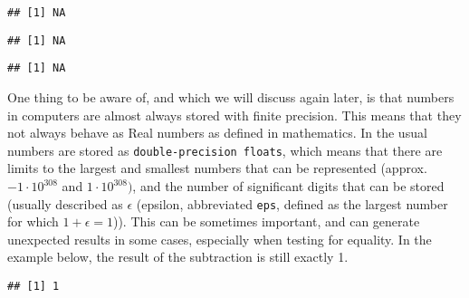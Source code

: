 \documentclass[paper=a4,headsepline,BCOR=12mm,twoside,open=right,%
titlepage,headings=small,fontsize=10pt,index=totoc,bibliography=totoc,%
captions=tableheading,captions=nooneline]{scrbook}\usepackage{knitr}
\begin{document}
\begin{knitrout}\footnotesize
{}\color{fgcolor}\begin{kframe}
\begin{alltt}
 \hlkwb{<-} 
\end{alltt}
\begin{verbatim}
## [1] NA
\end{verbatim}
\begin{alltt}
 \hlopt{+} 
\end{alltt}
\begin{verbatim}
## [1] NA
\end{verbatim}
\begin{alltt}
 \hlopt{+} 
\end{alltt}
\begin{verbatim}
## [1] NA
\end{verbatim}
\end{kframe}
\end{knitrout}

One thing to be aware of, and which we will discuss again later, is that numbers in computers are almost always stored with finite precision. This means that they not always behave as Real numbers as defined in mathematics. In \R the usual numbers are stored as \texttt{double-precision floats}, which means that there are limits to the largest and smallest numbers that can be represented (approx. $-1 \cdot 10^{308}$ and $1 \cdot 10^{308})$, and the number of significant digits that can be stored (usually described as $\epsilon$ (epsilon, abbreviated \texttt{eps}, defined as the largest number for which $ 1 + \epsilon = 1$)). This can be sometimes important, and can generate unexpected results in some cases, especially when testing for equality. In the example below, the result of the subtraction is still exactly 1. \label{par:float}

\begin{knitrout}\footnotesize
{}\color{fgcolor}\begin{kframe}
\begin{alltt}
 \hlopt{-} 
\end{alltt}
\begin{verbatim}
## [1] 1
\end{verbatim}
\end{kframe}
\end{knitrout}
\end{document}
